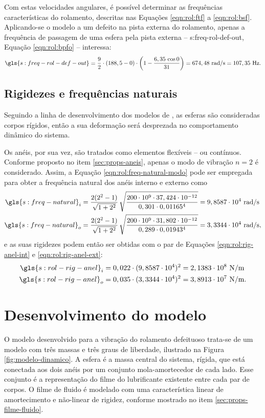 \documentclass[12pt,oneside,english,brazil,lmodern,siglas,simbolos,cite=num]{ucsmonograph}
\begin{document}
	Com estas velocidades angulares, é possível determinar as frequências características do rolamento, descritas nas Equações \ref{eqn:rol:ftf} a \ref{eqn:rol:bsf}.
	Aplicando-se o modelo a um defeito na pista externa do rolamento, apenas a frequência de passagem de uma esfera pela pista externa -- \gls{s:freq-rol-def-out}, Equação \ref{eqn:rol:bpfo} -- interessa:
	\begin{equation*}
		\gls{s:freq-rol-def-out} = \frac{9}{2}\cdot(188,5 - 0)\cdot
		\left( 1 - \frac{6,35\,\cos 0}{31} \right) =
		674,48\ \text{rad/s} =	107,35\ \text{Hz}.
	\end{equation*}
	
	\subsection{Rigidezes e frequências naturais}
	Seguindo a linha de desenvolvimento dos modelos de \cite{mcfadden:1984,tandon:1997,sassi:2007,cong:2013}, as esferas são consideradas corpos rígidos, então a sua deformação será desprezada no comportamento dinâmico do sistema.
	
	Os anéis, por sua vez, são tratados como elementos flexíveis -- ou contínuos.
	Conforme proposto no item \ref{sec:props-aneis}, apenas o modo de vibração $n=2$ é considerado.
	Assim, a Equação \ref{eqn:rol:freq-natural-modo} pode ser empregada para obter a frequência natural dos anéis interno e externo como
	\begin{align*}
		\gls{s:freq-natural}_i &= \frac{2(2^2 - 1)}{\sqrt{1+2^2}}\,
		\sqrt{\frac{200\cdot 10^9\cdot 37,424\cdot 10^{-12}}{0,301
		\cdot 0,01165^4}} = 9,8587\cdot 10^4\ \text{rad/s} \\
		\gls{s:freq-natural}_o &= \frac{2(2^2 - 1)}{\sqrt{1+2^2}}\,
		\sqrt{\frac{200\cdot 10^9\cdot 31,802\cdot 10^{-12}}{0,289
		\cdot 0,01943^4}} = 3,3344\cdot 10^4\ \text{rad/s},
	\end{align*}
	e as suas rigidezes podem então ser obtidas com o par de Equações \ref{eqn:rol:rig-anel-int} e \ref{eqn:rol:rig-anel-ext}:
	\begin{align*}
		\gls{s:rol-rig-anel}_i &= 0,022\cdot(9,8587\cdot 10^4)^2 =
		2,1383\cdot10^8\ \text{N/m} \\
		\gls{s:rol-rig-anel}_o &= 0,035\cdot(3,3344\cdot 10^4)^2 =
		3,8913\cdot10^7\ \text{N/m}.
	\end{align*}
	
	\section{Desenvolvimento do modelo}
	O modelo desenvolvido para a vibração do rolamento defeituoso trata-se de um modelo com três massas e três graus de liberdade, ilustrado na Figura \ref{fig:modelo-dinamico}.
	A esfera é a massa central do sistema, rígida, que está conectada aos dois anéis por um conjunto mola-amortecedor de cada lado.
	Esse conjunto é a representação do filme do lubrificante existente entre cada par de corpos.
	O filme de fluido é modelado com uma característica linear de amortecimento e não-linear de rigidez, conforme mostrado no item \ref{sec:props-filme-fluido}.
	
\end{document}
